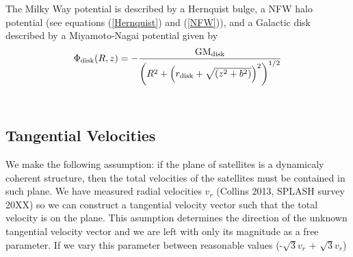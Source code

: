 \documentclass[useAMS,usenatbib]{mn2e}
\begin{document}
The Milky Way potential is described by a Hernquist bulge, a NFW halo potential (see equations (\ref{Hernquist}) and (\ref{NFW})), 
and a Galactic disk described by a Miyamoto-Nagai potential \citep{1975PASJ...27..533M} given by
\begin{equation}
\Phi_{\rm{disk}}(R,z)=-\frac{\rm{GM_{disk}}}{\left(R^2+\left(r_{\rm{disk}}+{\sqrt{(z^2+b^2)}}\right)^2\right)^{1/2}}
\end{equation}\\


\subsection{Tangential Velocities}
We make the following assumption: if the plane of satellites is a
dynamicaly coherent structure, then the total velocities of the
satellites must be contained in such plane. We have measured radial
velocities $v_r$ (Collins 2013, SPLASH survey 20XX) so we can construct a
tangential velocity vector such that the total velocity is on the
plane. This asumption determines the direction of the unknown tangential
velocity vector and we are left with only its magnitude as a free
parameter. If we vary this parameter between reasonable values
(-$\sqrt 3 v_r$ + $\sqrt 3 v_r$) 
\end{document}
